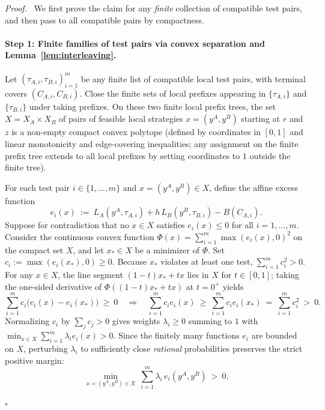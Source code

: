 \documentclass[11pt,letterpaper]{article}
\newenvironment{proof}[1][Proof]{\par\smallskip\noindent\textit{#1.}\ \ignorespaces}{\hfill$\square$\par\medskip}
\begin{document}
\begin{proof}
We first prove the claim for any \emph{finite} collection of compatible test pairs, and then pass to all compatible pairs by compactness.

\paragraph{Step 1: Finite families of test pairs via convex separation and Lemma~\ref{lem:interleaving}.}
Let $(\tau_{A,i},\tau_{B,i})_{i=1}^m$ be any finite list of compatible local test pairs, with terminal covers $(C_{A,i},C_{B,i})$. Close the finite sets of local prefixes appearing in $\{\tau_{A,i}\}$ and $\{\tau_{B,i}\}$ under taking prefixes. On these two finite local prefix trees, the set $X = X_A\times X_B$ of pairs of feasible local strategies $x=(y^A,y^B)$ starting at $r$ and $z$ is a non-empty compact convex polytope (defined by coordinates in $[0,1]$ and linear monotonicity and edge-covering inequalities; any assignment on the finite prefix tree extends to all local prefixes by setting coordinates to $1$ outside the finite tree).

For each test pair $i\in\{1,\ldots,m\}$ and $x=(y^A,y^B)\in X$, define the affine excess function
\[
  e_i(x)\ :=\ L_A(y^A,\tau_{A,i}) + h\,L_B(y^B,\tau_{B,i}) - B(C_{A,i}).
\]
Suppose for contradiction that no $x\in X$ satisfies $e_i(x)\le 0$ for all $i=1,\ldots,m$. Consider the continuous convex function $\Phi(x) = \sum_{i=1}^m \max(e_i(x),0)^2$ on the compact set $X$, and let $x_*\in X$ be a minimizer of $\Phi$. Set $c_i := \max(e_i(x_*),0)\ge 0$. Because $x_*$ violates at least one test, $\sum_{i=1}^m c_i^2 > 0$. For any $x\in X$, the line segment $(1-t)x_* + t x$ lies in $X$ for $t\in[0,1]$; taking the one-sided derivative of $\Phi((1-t)x_*+tx)$ at $t=0^+$ yields
\[
  \sum_{i=1}^m c_i\bigl(e_i(x)-e_i(x_*)\bigr)\ \ge\ 0
  \quad\Longrightarrow\quad
  \sum_{i=1}^m c_i e_i(x)\ \ge\ \sum_{i=1}^m c_i e_i(x_*)\ =\ \sum_{i=1}^m c_i^2\ >\ 0.
\]
Normalizing $c_i$ by $\sum_j c_j > 0$ gives weights $\lambda_i\ge 0$ summing to $1$ with $\min_{x\in X} \sum_{i=1}^m \lambda_i e_i(x) > 0$. Since the finitely many functions $e_i$ are bounded on $X$, perturbing $\lambda_i$ to sufficiently close \emph{rational} probabilities preserves the strict positive margin:
\[
  \min_{x=(y^A,y^B)\in X}\ \sum_{i=1}^m \lambda_i\, e_i(y^A,y^B)\ >\ 0.
\]


\end{proof}
\end{document}
